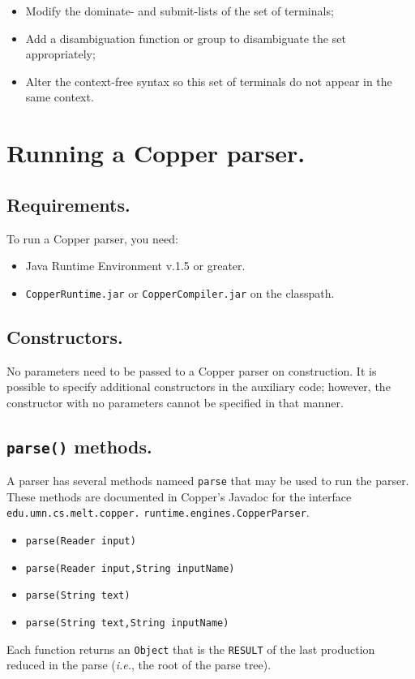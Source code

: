 \documentclass[12pt,english,twoside]{report}
\begin{document}
\begin{itemize}
\item Modify the dominate- and submit-lists of the set of terminals;
\item Add a disambiguation function or group to disambiguate the set appropriately;
\item Alter the context-free syntax so this set of terminals do not appear
in the same context.
\end{itemize}

\chapter{\label{cha:Running-a-Copper-parser.}Running a Copper parser.}

\section{Requirements.}

To run a Copper parser, you need:

\begin{itemize}
\item Java Runtime Environment v.1.5 or greater.
\item \texttt{CopperRuntime.jar} or \texttt{CopperCompiler.jar} on the classpath.
\end{itemize}

\section{Constructors.}

No parameters need to be passed to a Copper parser on construction.
It is possible to specify additional constructors in the auxiliary
code; however, the constructor with no parameters cannot be specified
in that manner.

\section{\texttt{parse()} methods.}

A parser has several methods nameed \texttt{parse} that may be used to
run the parser. These methods are documented in Copper's Javadoc for
the interface
\texttt{edu.}\texttt{umn.}\texttt{cs.}\texttt{melt.}\texttt{copper.} \texttt{runtime.}\texttt{engines.}\texttt{CopperParser}.

\begin{itemize}
\item \texttt{parse(Reader input)}
\item \texttt{parse(Reader input,String inputName)}
\item \texttt{parse(String text)}
\item \texttt{parse(String text,String inputName)}
\end{itemize}
Each function returns an \texttt{Object} that is the \texttt{RESULT}
of the last production reduced in the parse (\emph{i.e.}, the root
of the parse tree).
\end{document}
